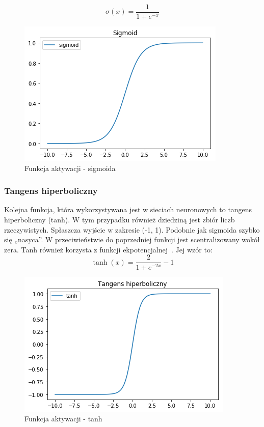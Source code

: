     \begin{equation}
        \sigma(x) = \frac {1}{1+e^{-x}}
    \end{equation}

    \begin{figure}[htp]
        \centering
        \includegraphics[scale=0.8]{./img/sigmoid.png}
        \caption{Funkcja aktywacji - sigmoida}
    \end{figure}

    \subsubsection{Tangens hiperboliczny}
    Kolejna funkcja, która wykorzystywana jest w sieciach neuronowych to tangens hiperboliczny (tanh).
    W tym przypadku również dziedziną jest zbiór liczb rzeczywistych.
    Spłaszcza wyjście w zakresie (-1, 1).
    Podobnie jak sigmoida szybko się „nasyca”.
    W przeciwieństwie do poprzedniej funkcji jest scentralizowany wokół zera.
    Tanh również korzysta z funkcji ekpotencjalnej~\cite{cs231_neural_2}.
    Jej wzór to:
    \begin{equation}
        \tanh(x) = \frac {2}{1+e^{-2x}} - 1
    \end{equation}

    \begin{figure}[htp]
        \centering
        \includegraphics[scale=0.8]{./img/tanh.png}
        \caption{Funkcja aktywacji - tanh}
    \end{figure}

